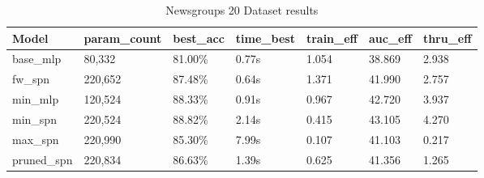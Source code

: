 \begin{table}[h!]
    \centering
    \caption{Newsgroups 20 Dataset results}
    \begin{tabular}{|l|l|l|l|l|l|l|}
    \hline
    \textbf{Model} & \textbf{param\_count} & \textbf{best\_acc} & \textbf{time\_best} & \textbf{train\_eff} & \textbf{auc\_eff} & \textbf{thru\_eff} \\
    \hline
    base\_mlp & 80,332 & \cellcolor{red!25}81.00\% & 0.77s & 1.054 & \cellcolor{red!25}38.869 & 2.938 \\
    fw\_spn & 220,652 & 87.48\% & \cellcolor{green!25}0.64s & \cellcolor{green!25}1.371 & 41.990 & 2.757 \\
    min\_mlp & 120,524 & 88.33\% & 0.91s & 0.967 & 42.720 & 3.937 \\
    min\_spn & 220,524 & \cellcolor{green!25}88.82\% & 2.14s & 0.415 & \cellcolor{green!25}43.105 & \cellcolor{green!25}4.270 \\
    max\_spn & 220,990 & 85.30\% & \cellcolor{red!25}7.99s & \cellcolor{red!25}0.107 & 41.103 & \cellcolor{red!25}0.217 \\
    pruned\_spn & 220,834 & 86.63\% & 1.39s & 0.625 & 41.356 & 1.265 \\
    \hline
    \end{tabular}
    \label{tab:newsgroupsResults}
\end{table}

